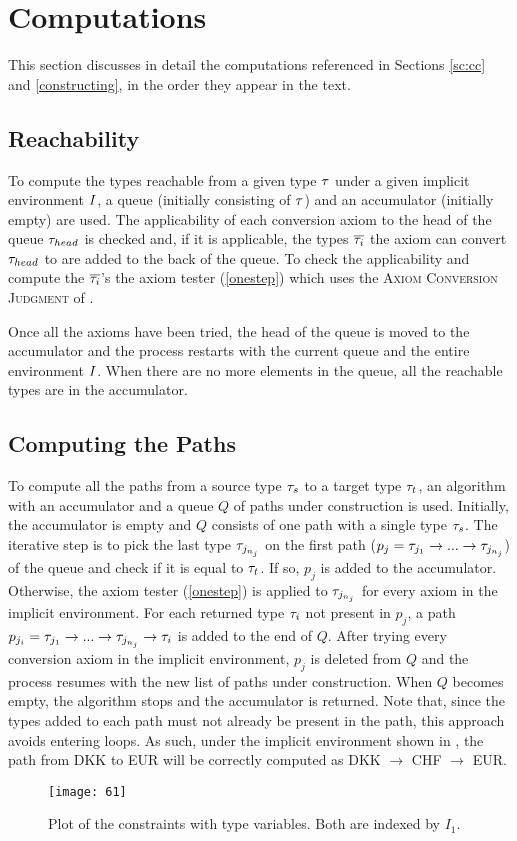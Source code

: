 \section{Computations}
\label{computations}
This section discusses in detail the computations referenced in Sections \ref{sc:cc} and \ref{constructing}, in the order they appear in the text.

\subsection{Reachability}
\label{reachability}
To compute the types reachable from a given type $\mathit{\tau}$ under a given implicit environment $I$, a queue (initially consisting of $\mathit{\tau}$) and an accumulator (initially empty) are used. The applicability of each conversion axiom to the head of the queue $\mathit{\tau}_{head}$ is checked and, if it is applicable, the types $\overline{\mathit{\tau}_i}$ the axiom can convert $\mathit{\tau}_{head}$ to are added to the back of the queue. To check the applicability and compute the $\overline{\mathit{\tau}_i}$'s the axiom tester (\ref{onestep}) which uses the \textsc{Axiom Conversion Judgment} of .

Once all the axioms have been tried, the head of the queue is moved to the accumulator and the process restarts with the current queue and the entire environment $I$. When there are no more elements in the queue, all the reachable types are in the accumulator.

\subsection{Computing the Paths}
\label{paths}
To compute all the paths from a source type $\mathit{\tau}_s$ to a target type $\mathit{\tau}_t$, an algorithm with an accumulator and a queue $Q$ of paths under construction is used. Initially, the accumulator is empty and $Q$ consists of one path with a single type $\mathit{\tau}_s$. The iterative step is to pick the last type $\mathit{\tau}_{j_{n_j}}$ on the first path ($p_j = \mathit{\tau}_{j_1}\to ... \to \mathit{\tau}_{j_{n_j}}$) of the queue and check if it is equal to $\mathit{\tau}_t$. If so, $p_j$ is added to the accumulator. Otherwise, the axiom tester (\ref{onestep}) is applied to $\mathit{\tau}_{j_{n_j}}$ for every axiom in the implicit environment. For each returned type $\mathit{\tau}_i$ not present in $p_j$, a path $p_{j_i} = \mathit{\tau}_{j_1}\to ... \to \mathit{\tau}_{j_{n_j}} \to \mathit{\tau}_i$ is added to the end of $Q$. After trying every conversion axiom in the implicit environment, $p_j$ is deleted from $Q$ and the process resumes with the new list of paths under construction. When $Q$ becomes empty, the algorithm stops and the accumulator is returned. Note that, since the types added to each path must not already be present in the path, this approach avoids entering loops. As such, under the implicit environment shown in , the path from DKK to EUR will be correctly computed as DKK $\to$ CHF $\to$ EUR.
  \begin{figure}
    \centering
    \texttt{[image: 61]}
    \caption{Plot of the constraints with type variables. Both are indexed by $I_1$.}
    \label{61}
  \end{figure}


